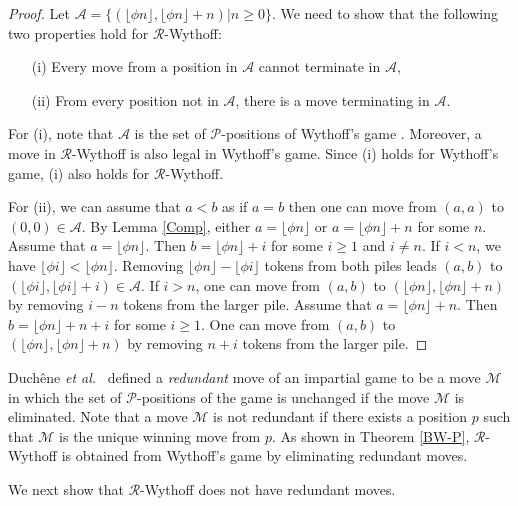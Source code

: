 \documentclass[12pt]{amsart}
\theoremstyle{plain}
\theoremstyle{definition}
\theoremstyle{remark}
\begin{document}
\begin{proof}
Let ${\mathcal{A}} = \{(\lfloor\phi n\rfloor, \lfloor \phi n \rfloor + n) | n \geq 0\}$. We need to show that the following two properties hold for ${\mathcal{R}}$-Wythoff:
\begin{itemize}
\item [(i)]  Every move from a position in ${\mathcal{A}}$ cannot terminate in ${\mathcal{A}}$,
\item [(ii)] From every position not in ${\mathcal{A}}$, there is a move terminating in ${\mathcal{A}}$.
\end{itemize}

For (i), note that ${\mathcal{A}}$ is the set of ${\mathcal{P}}$-positions of Wythoff's game \cite{Wyt}. Moreover, a move in ${\mathcal{R}}$-Wythoff is also legal in Wythoff's game. Since (i) holds for Wythoff's game, (i) also holds for ${\mathcal{R}}$-Wythoff.

For (ii), we can assume that $a < b$ as if $a = b$ then one can move from $(a,a)$ to $(0,0) \in {\mathcal{A}}$. By Lemma \ref{Comp}, either $a = \lfloor\phi n\rfloor$ or $a = \lfloor\phi n\rfloor + n$ for some $n$. Assume that $a = \lfloor\phi n\rfloor$. Then $b = \lfloor\phi n\rfloor + i$ for some $i \geq 1$ and $i \neq n$. If $i < n$, we have $\lfloor\phi i\rfloor < \lfloor\phi n\rfloor$. Removing $\lfloor\phi n\rfloor - \lfloor\phi i\rfloor$ tokens from both piles leads $(a,b)$ to $(\lfloor\phi i\rfloor, \lfloor\phi i\rfloor+i) \in {\mathcal{A}}$. If $i > n$, one can move from $(a,b)$ to $(\lfloor\phi n\rfloor, \lfloor\phi n\rfloor+n)$ by removing $i-n$ tokens from the larger pile. Assume that $a = \lfloor\phi n\rfloor + n$. Then $b = \lfloor\phi n\rfloor + n +i$ for some $i \geq 1$. One can move from $(a,b)$ to $(\lfloor\phi n\rfloor, \lfloor\phi n\rfloor + n)$ by removing $n+i$ tokens from the larger pile.
\end{proof}

Duch\^{e}ne \emph{et al.}~\cite{Ext-Res} defined a \emph{redundant} move of an impartial game to be a move $\mathcal{M}$ in which the set of ${\mathcal{P}}$-positions of the game is unchanged if the move $\mathcal{M}$ is eliminated. Note that a move $\mathcal{M}$ is not redundant if there exists a position $p$ such that $\mathcal{M}$ is the unique winning move from $p$. As shown in Theorem \ref{BW-P}, ${\mathcal{R}}$-Wythoff is obtained from Wythoff's game by eliminating  redundant moves.

\medskip
We next show that ${\mathcal{R}}$-Wythoff does not have redundant moves.
\end{document}
